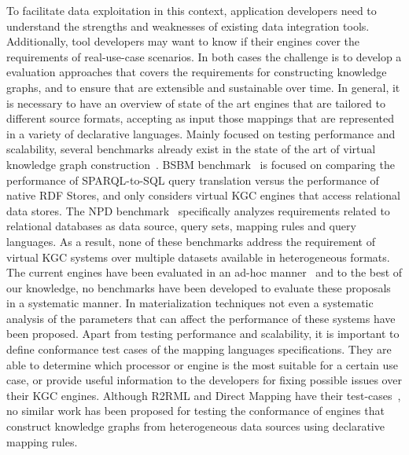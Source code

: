 To facilitate data exploitation in this context, application developers need to understand the strengths and weaknesses of existing data integration tools. Additionally, tool developers may want to know if their engines cover the requirements of real-use-case scenarios. In both cases the challenge is to develop a evaluation approaches that covers the requirements for constructing knowledge graphs, and to ensure that are extensible and sustainable over time. In general, it is necessary to have an overview of state of the art engines that are tailored to different source formats, accepting as input those mappings that are represented in a variety of declarative languages. Mainly focused on testing performance and scalability, several benchmarks already exist in the state of the art of virtual knowledge graph construction~\citep{bizer2009berlin,lanti2015npd}. BSBM benchmark~\citep{bizer2009berlin} is focused on comparing the performance of SPARQL-to-SQL query translation versus the performance of native RDF Stores, and only considers virtual KGC engines that access relational data stores. The NPD benchmark~\citep{lanti2015npd} specifically analyzes requirements related to relational databases as data source, query sets, mapping rules and query languages. As a result, none of these benchmarks address the requirement of virtual KGC systems over multiple datasets available in heterogeneous formats. The current engines have been evaluated in an ad-hoc manner~\citep{endris2019ontario,mami2019querying} and to the best of our knowledge, no benchmarks have been developed to evaluate these proposals in a systematic manner. In materialization techniques not even a systematic analysis of the parameters that can affect the performance of these systems have been proposed. Apart from testing performance and scalability, it is important to define conformance test cases of the mapping languages specifications. They are able to determine which processor or engine is the most suitable for a certain use case, or provide useful information to the developers for fixing possible issues over their KGC engines. Although R2RML and Direct Mapping have their test-cases~\citep{R2RML_test_cases}, no similar work has been proposed for testing the conformance of engines that construct knowledge graphs from heterogeneous data sources using declarative mapping rules.








